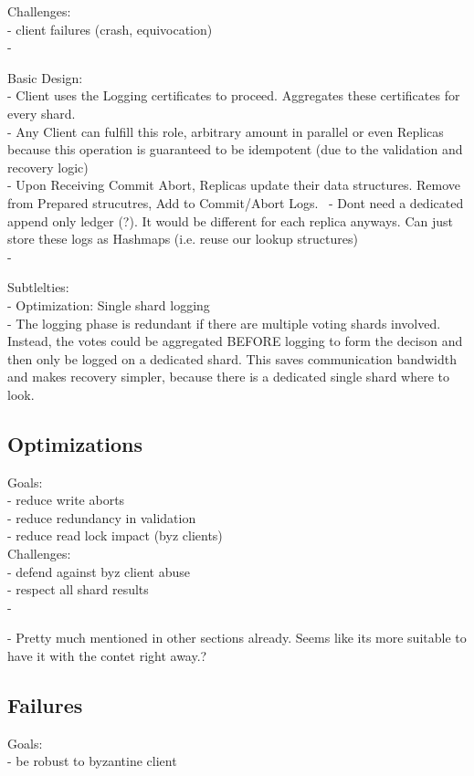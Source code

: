 Challenges:\\
- client failures (crash, equivocation)\\
- 

Basic Design:\\
- Client uses the Logging certificates to proceed. Aggregates these certificates for every shard.\\
- Any Client can fulfill this role, arbitrary amount in parallel or even Replicas because this operation is guaranteed to be idempotent (due to the validation and recovery logic)\\
- Upon Receiving Commit Abort, Replicas update their data structures. Remove from Prepared strucutres, Add to Commit/Abort Logs. \
- Dont need a dedicated append only ledger (?). It would be different for each replica anyways. Can just store these logs as Hashmaps (i.e. reuse our lookup structures)\\
- 

Subtlelties:\\
- Optimization: Single shard logging\\
- The logging phase is redundant if there are multiple voting shards involved. Instead, the votes could be aggregated BEFORE logging to form the decison and then only be logged on a dedicated shard. This saves communication bandwidth and makes recovery simpler, because there is a dedicated single shard where to look.\\

\subsection{Optimizations}
Goals:\\
- reduce write aborts\\
- reduce redundancy in validation\\
- reduce read lock impact (byz clients)\\

Challenges:\\
- defend against byz client abuse\\
- respect all shard results\\
- 

- Pretty much mentioned in other sections already. Seems like its more suitable to have it with the contet right away.?

\subsection{Failures}
Goals:\\
- be robust to byzantine client\\


